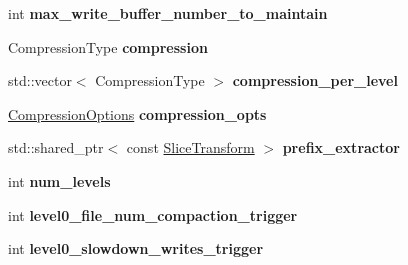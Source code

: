 \begin{DoxyCompactItemize}
\item 
int {\bfseries max\+\_\+write\+\_\+buffer\+\_\+number\+\_\+to\+\_\+maintain}\hypertarget{structrocksdb_1_1ColumnFamilyOptions_a7b01c7716e16303a00378471e3801c49}{}\label{structrocksdb_1_1ColumnFamilyOptions_a7b01c7716e16303a00378471e3801c49}

\item 
Compression\+Type {\bfseries compression}\hypertarget{structrocksdb_1_1ColumnFamilyOptions_a4f1b99a6823346ecf84c3348af150664}{}\label{structrocksdb_1_1ColumnFamilyOptions_a4f1b99a6823346ecf84c3348af150664}

\item 
std\+::vector$<$ Compression\+Type $>$ {\bfseries compression\+\_\+per\+\_\+level}\hypertarget{structrocksdb_1_1ColumnFamilyOptions_a44c7242eb5bf1a2491744100a19a03a4}{}\label{structrocksdb_1_1ColumnFamilyOptions_a44c7242eb5bf1a2491744100a19a03a4}

\item 
\hyperlink{structrocksdb_1_1CompressionOptions}{Compression\+Options} {\bfseries compression\+\_\+opts}\hypertarget{structrocksdb_1_1ColumnFamilyOptions_afeaa71f74b931e03adcdd4d797046649}{}\label{structrocksdb_1_1ColumnFamilyOptions_afeaa71f74b931e03adcdd4d797046649}

\item 
std\+::shared\+\_\+ptr$<$ const \hyperlink{classrocksdb_1_1SliceTransform}{Slice\+Transform} $>$ {\bfseries prefix\+\_\+extractor}\hypertarget{structrocksdb_1_1ColumnFamilyOptions_a0f2502c0d8da4065cb2c17f3bab4ce94}{}\label{structrocksdb_1_1ColumnFamilyOptions_a0f2502c0d8da4065cb2c17f3bab4ce94}

\item 
int {\bfseries num\+\_\+levels}\hypertarget{structrocksdb_1_1ColumnFamilyOptions_a80a36f81f955c2cec0cc5ca5d198a3fb}{}\label{structrocksdb_1_1ColumnFamilyOptions_a80a36f81f955c2cec0cc5ca5d198a3fb}

\item 
int {\bfseries level0\+\_\+file\+\_\+num\+\_\+compaction\+\_\+trigger}\hypertarget{structrocksdb_1_1ColumnFamilyOptions_a32207c8143efa9d6030e7c2fe4bfc5e0}{}\label{structrocksdb_1_1ColumnFamilyOptions_a32207c8143efa9d6030e7c2fe4bfc5e0}

\item 
int {\bfseries level0\+\_\+slowdown\+\_\+writes\+\_\+trigger}\hypertarget{structrocksdb_1_1ColumnFamilyOptions_a215b1a0828086c70f1c6977f50b6c428}{}\label{structrocksdb_1_1ColumnFamilyOptions_a215b1a0828086c70f1c6977f50b6c428}


\end{DoxyCompactItemize}
